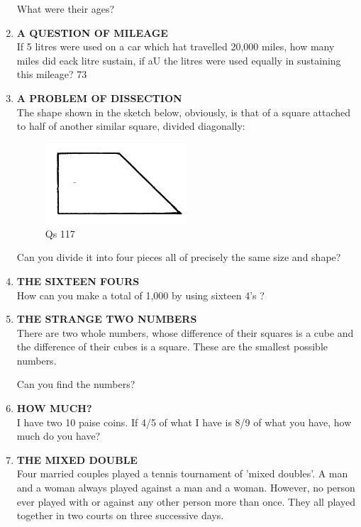 \documentclass[12pt]{article}
\begin{document}
\begin{enumerate}
What  were  their  ages? 
%
\item \textbf{A  QUESTION  OF MILEAGE} \\
If 5 litres  were  used  on a car  which  hat  travelled 20,000  miles,  how  many  miles  did eack  litre  sustain,  if aU the litres  were  used  equally  in sustaining  this mileage? 
73 
%
\item \textbf{A  PROBLEM  OF  DISSECTION} \\ 
The shape  shown  in the  sketch  below,  obviously,  is that of a square  attached  to half  of another  similar  square, divided  diagonally: 

\begin{figure}[h]
\begin{center}
\includegraphics[width=0.5\textwidth]{images/sdevi_q117.png}
\caption{ Qs 117}
\end{center}
\end{figure}


Can you divide  it into  four  pieces  all of precisely  the same  size and shape? 
%
\item \textbf{THE SIXTEEN  FOURS} \\ 
How  can  you  make  a total  of 1,000  by using  sixteen 4's ? 

\item \textbf{THE STRANGE  TWO  NUMBERS} \\
There  are  two  whole  numbers,  whose  difference  of their squares  is a cube  and the  difference  of their  cubes is a square.  These  are the  smallest  possible  numbers. 

Can you  find  the numbers? 


\item \textbf{HOW MUCH?} \\
I have  two 10 paise  coins.  If 4/5 of  what  I have  is 8/9
of what  you have,  how  much  do you have? 

\item \textbf{THE MIXED  DOUBLE} \\ 
Four  married  couples  played  a tennis  tournament  of 'mixed  doubles'.  A man  and  a woman  always  played against  a man  and a woman.  However,  no person  ever played  with  or against  any other  person  more  than  once. They  all played  together  in two courts  on three  successive days. 


\end{enumerate}
\end{document}

